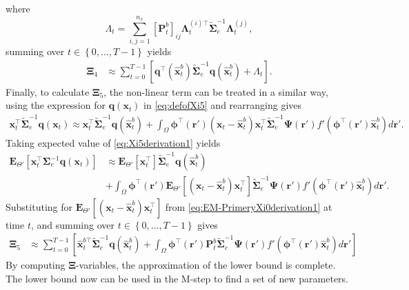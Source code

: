 \documentclass[]{article}
\begin{document}
where
\begin{equation}
 \boldsymbol\varLambda_t=\sum_{i,j=1}^{n_x}[\mathbf{P}_t^b]_{ij}{\boldsymbol\Lambda}_t^{(i)\top}\tilde{\boldsymbol\Sigma}_e^{-1}{\boldsymbol\Lambda}_t^{(j)},
\end{equation}
summing over $t \in \left\lbrace 0, \dots, T-1\right\rbrace $ yields
\begin{align}
 \boldsymbol\Xi_{4}&\approx\sum_{t=0}^{T-1}\left[\mathbf q^\top(\mathbf{\hat x}_t^b)\tilde{\boldsymbol\Sigma}_e^{-1}\mathbf q(\mathbf{\hat x}_t^b)+\boldsymbol\varLambda_t\right]\label{eq:Xi4Ap}. 
\end{align}
Finally, to calculate $\boldsymbol\Xi_5$, the non-linear term can be treated in a similar way, using the expression for $\mathbf q(\mathbf x_t)$ in \eqref{eq:defofXi5} and rearranging gives
\begin{align}\label{eq:Xi5derivation1}
 \mathbf x_t^\top\tilde{\boldsymbol\Sigma}_e^{-1}\mathbf q(\mathbf x_t)\approx\mathbf x_t^\top\tilde{\boldsymbol\Sigma}_e^{-1}\mathbf q(\mathbf {\hat x}_t^b)+\int_\Omega \boldsymbol \phi^\top(\mathbf r') (\mathbf x_t - \mathbf  {\hat x}_t^b)\mathbf x_t^\top\tilde{\boldsymbol\Sigma}_e^{-1}\boldsymbol{\Psi}(\mathbf{r}')f'(\boldsymbol \phi^\top(\mathbf r')\mathbf {\hat x}_t^b) d\mathbf{r}'.
\end{align}
Taking expected value of \eqref{eq:Xi5derivation1} yields
\begin{align}\label{eq:Xi5derivation2}
\mathbf E_{\Theta'}\left[\mathbf x_t^\top\boldsymbol\Sigma_e^{-1}\mathbf q(\mathbf x_t)\right]&\approx\mathbf E_{\Theta'}\left[\mathbf x_t^\top\right]\tilde{\boldsymbol\Sigma}_e^{-1}\mathbf q(\mathbf {\hat x}_t^b)\nonumber \\
&+\int_\Omega \boldsymbol \phi^\top(\mathbf r') \mathbf E_{\Theta'}\left[(\mathbf x_t - \mathbf  {\hat x}_t^b)\mathbf x_t^\top\right]\tilde{\boldsymbol\Sigma}_e^{-1}\boldsymbol{\Psi}(\mathbf{r}')f'(\boldsymbol \phi^\top(\mathbf r')\mathbf {\hat x}_t^b) d\mathbf{r}'.
\end{align}
Substituting for $\mathbf E_{\Theta'}\left[(\mathbf x_t - \mathbf  {\hat x}_t^b)\mathbf x_t^\top\right] $ from \eqref{eq:EM-PrimeryXi0derivation1} at time $t$, and summing over $t \in \left\lbrace 0, \dots, T-1\right\rbrace $ gives
\begin{align}
\boldsymbol\Xi_{5}&\approx\sum_{t=0}^{T-1}\left[ \mathbf{\hat x}_{t}^{b\top}\tilde{\boldsymbol\Sigma}_e^{-1}\mathbf q(\mathbf{\hat x}_t^b)+\int_\Omega\boldsymbol \phi^\top(\mathbf r') \mathbf P_t^b \tilde{\boldsymbol\Sigma}_e^{-1}  \boldsymbol{\Psi}(\mathbf{r}') f'(\boldsymbol \phi^\top(\mathbf r')\mathbf {\hat x}_t^b) d\mathbf{r}'\right] \label{eq:Xi5Ap}
 \end{align}
By computing $\boldsymbol\Xi$-variables, the approximation of the lower bound is complete. The lower bound now can be used in the M-step to find a set of new parameters. 
\end{document}
